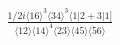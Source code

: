 \documentclass[varwidth, border=5pt]{standalone}
\begin{document}
\begin{my}
$\begin{gathered}
\scriptscriptstyle\frac{1/2i\langle16\rangle^3\langle34\rangle^3\langle1|2+3|1]}{\langle12\rangle\langle14\rangle^4\langle23\rangle\langle45\rangle\langle56\rangle}
\end{gathered}$
\end{my}
\end{document}
